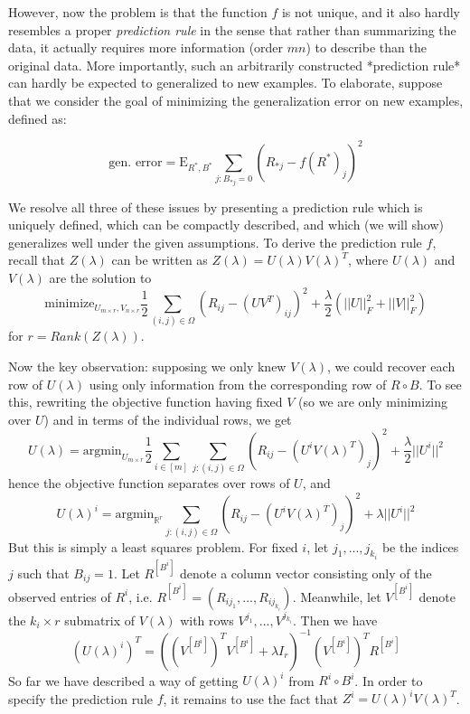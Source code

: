 \documentclass[11pt]{article}
\begin{document}
However, now the problem is that the function $f$ is not unique, and
it also hardly resembles a proper \emph{prediction rule} in the sense
that rather than summarizing the data, it actually requires more
information (order $mn$) to describe than the original data.  More
importantly, such an arbitrarily constructed *prediction rule* can
hardly be expected to generalized to new examples.  To elaborate,
suppose that we consider the goal of minimizing the generalization
error on new examples, defined as:

$$
\text{gen. error} = \text{E}_{R^*, B^*} \sum_{j: B_{*j} = 0} (R_{* j} - f(R^*)_j)^2
$$

We resolve all three of these issues by presenting a prediction rule
which is uniquely defined, which can be compactly described, and which
(we will show) generalizes well under the given assumptions.  To
derive the prediction rule $f$, recall that $Z(\lambda)$ can be
written as $Z(\lambda) = U(\lambda)V(\lambda)^T$, where $U(\lambda)$
and $V(\lambda)$ are the solution to
$$
\text{minimize}_{U_{m\times r}, V_{n \times r}} \frac{1}{2} \sum_{(i, j) \in \Omega} (R_{ij} - (UV^T)_{ij})^2 + \frac{\lambda}{2}(||U||^2_F + ||V||^2_F)
$$
for $r = Rank(Z(\lambda))$.

Now the key observation: supposing we only knew $V(\lambda)$, we could
recover each row of $U(\lambda)$ using only information from the
corresponding row of $R \circ B$.  To see this, rewriting the
objective function having fixed $V$ (so we are only minimizing over
$U$) and in terms of the individual rows, we get
$$
U(\lambda) = \text{argmin}_{U_{m\times r}} \frac{1}{2} \sum_{i \in [m]} \sum_{j : (i,j) \in \Omega} (R_{ij}  - (U^i V(\lambda)^T)_j)^2 + \frac{\lambda}{2}||U^i||^2
$$
hence the objective function separates over rows of $U$, and
$$
U(\lambda)^i = \text{argmin}_{\mathbb{R}^r} \sum_{j : (i,j) \in \Omega} (R_{ij}  - (U^i V(\lambda)^T)_j)^2 + \lambda||U^i||^2
$$
But this is simply a least squares problem. For fixed $i$, let $j_1,..., j_{k_i}$ be the indices $j$ such that $B_{ij} = 1$.
Let $R^{[B^i]}$ denote a column vector consisting only of the observed entries of $R^i$, i.e. $R^{[B^i]} = (R_{ij_1}, ... , R_{ij_{k_i}})$.  
Meanwhile, let $V^{[B^i]}$ denote the $k_i \times r$ submatrix of $V(\lambda)$ with rows
$V^{j_1} , ...,  V^{j_{k_i}}$.
Then we have
$$
(U(\lambda)^i)^T = ((V^{[B^i]})^T V^{[B^i]} + \lambda I_r)^{-1} (V^{[B^i]})^T R^{[B^i]}
$$ So far we have described a way of getting $U(\lambda)^i$ from $R^i
\circ B^i$.  In order to specify the prediction rule $f$, it remains
to use the fact that $Z^i = U(\lambda)^i V(\lambda)^T$.
\end{document}
